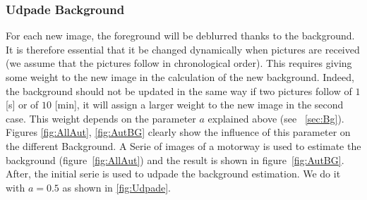 \subsubsection{Udpade Background}
\label{subsec:UdpadeBg}

For each new image, the foreground will be deblurred thanks to the background. It is therefore essential that it be changed dynamically when pictures are received (we assume that the pictures follow in chronological order). This requires giving some weight to the new image in the calculation of the new background. Indeed, the background should not be updated in the same way if two pictures follow of $1$ [s] or of $10$ [min], it will assign a larger weight to the new image in the second case. This weight depends on the parameter $a$ explained above (see ~\ref{sec:Bg}). Figures \ref{fig:AllAut}, \ref{fig:AutBG} clearly show the influence of this parameter on the different Background. A Serie of images of a motorway is used to estimate the background (figure~\ref{fig:AllAut}) and the result is shown in figure~\ref{fig:AutBG}. After, the initial serie is used to udpade the background estimation. We do it with $a=0.5$ as shown in \ref{fig:Udpade}.

